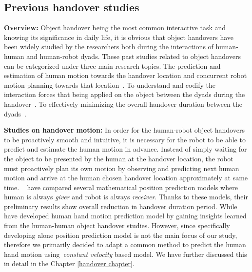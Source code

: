 \subsection{Previous handover studies}

\textbf{Overview:} Object handover being the most common interactive task and knowing its significance in daily life, it is obvious that object handovers have been widely studied by the researchers both during the interactions of human-human and human-robot dyads. These past studies related to object handovers can be categorized under three main research topics. The prediction and estimation of human motion towards the handover location and concurrent robot motion planning towards that location~\cite{huber2008Indus, li2015predicting, waldhart2015planning, mainprice2012sharing, vahrenkamp2009humanoid, kim2004advanced, mainprice2010planning}. To understand and codify the interaction forces that being applied on the object between the dyads during the handover~\cite{chan2014implementation, medina2016human, chan2013human, sadigh2009safe, nagata1998delivery}. To effectively minimizing the overall handover duration between the dyads~\cite{nemlekarprompt, cakmak2011using, huber2008human, nemlekar2019object}.

\textbf{Studies on handover motion:} In order for the human-robot object handovers to be proactively smooth and intuitive, it is necessary for the robot to be able to predict and estimate the human motion in advance. Instead of simply waiting for the object to be presented by the human at the handover location, the robot must proactively plan its own motion by observing and predicting next human motion and arrive at the human chosen handover location approximately at same time. ~\cite{li2015predicting} have compared several mathematical position prediction models where human is always \textit{giver} and robot is always \textit{receiver}. Thanks to these models, their preliminary results show overall reduction in handover duration period. While~\cite{perez2015fast, sheikholeslami2018prediction, vogt2017system, kupcsik2016learning}  have developed human hand motion prediction model by gaining insights learned from the human-human object handover studies. However, since specifically developing alone position prediction model is not the main focus of our study, therefore we primarily decided to adapt a common method to predict the human hand motion using~\textit{constant velocity} based model. We have further discussed this in detail in the Chapter \ref{handover chapter}.

